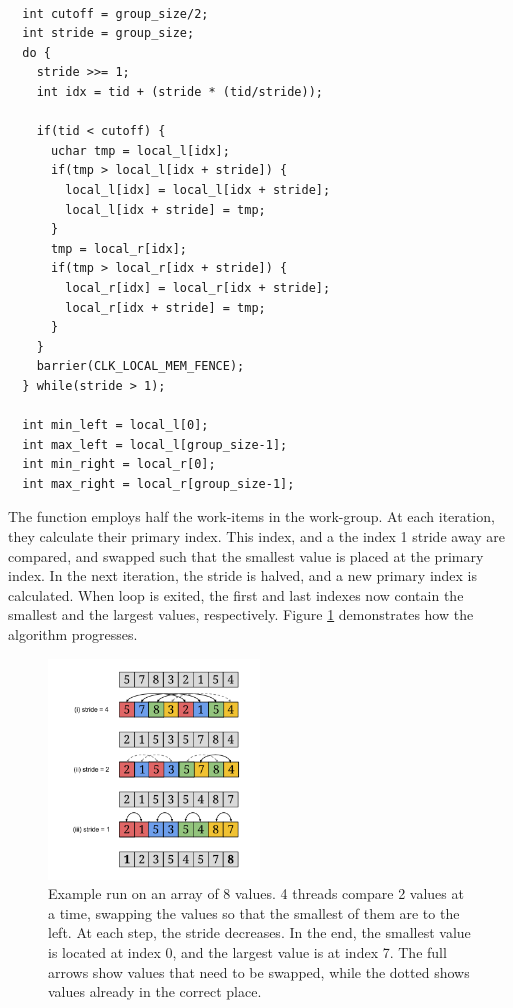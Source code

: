 \begin{lstlisting}[label={lst:minmax}, caption=Finding min and max
    values in parallel]

  int cutoff = group_size/2;
  int stride = group_size;
  do {
    stride >>= 1;
    int idx = tid + (stride * (tid/stride));

    if(tid < cutoff) {
      uchar tmp = local_l[idx];
      if(tmp > local_l[idx + stride]) {
        local_l[idx] = local_l[idx + stride];
        local_l[idx + stride] = tmp;
      }
      tmp = local_r[idx];
      if(tmp > local_r[idx + stride]) {
        local_r[idx] = local_r[idx + stride];
        local_r[idx + stride] = tmp;
      }
    }
    barrier(CLK_LOCAL_MEM_FENCE);
  } while(stride > 1);

  int min_left = local_l[0];
  int max_left = local_l[group_size-1];
  int min_right = local_r[0];
  int max_right = local_r[group_size-1];

\end{lstlisting}

The function employs half the work-items in the work-group. At each
iteration, they calculate their primary index. This index, and a the
index 1 stride away are compared, and swapped such that the smallest
value is placed at the primary index. In the next iteration, the
stride is halved, and a new primary index is calculated. When loop is
exited, the first and last indexes now contain the smallest and the
largest values, respectively. Figure \ref{minmax-example-figure}
demonstrates how the algorithm progresses.


\begin{figure}[h!]
  \centering
  \includegraphics[width=0.5\textwidth]{images/minmax-example.png}
  \caption{Example run on an array of 8 values. 4 threads compare 2
    values at a time, swapping the values so that the smallest of them
  are to the left. At each step, the stride decreases. In the end, the
  smallest value is located at index 0, and the largest value is at
  index 7. The full arrows show values that need to be swapped, while
  the dotted shows values already in the correct place.}
  \label{minmax-example-figure}
\end{figure}


